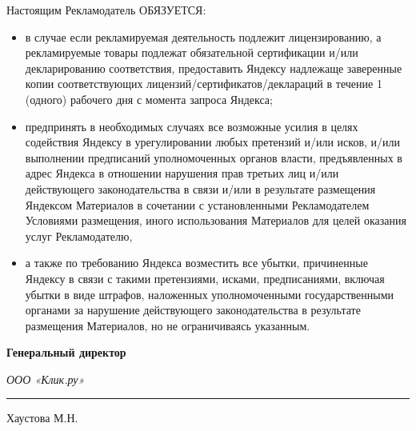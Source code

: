 \noindent
    Настоящим Рекламодатель ОБЯЗУЕТСЯ:

\begin{itemize}
    \item в случае если рекламируемая деятельность подлежит лицензированию,
        а рекламируемые товары подлежат обязательной сертификации и/или
        декларированию соответствия, предоставить Яндексу надлежаще заверенные
        копии соответствующих лицензий/сертификатов/деклараций в течение 1
        (одного) рабочего дня с момента запроса Яндекса;

    \item предпринять в необходимых случаях все возможные усилия в целях
        содействия Яндексу в урегулировании любых претензий и/или исков,
        и/или выполнении предписаний уполномоченных органов власти,
        предъявленных в адрес Яндекса в отношении нарушения прав третьих
        лиц и/или действующего законодательства в связи и/или в результате
        размещения Яндексом Материалов в сочетании с установленными
        Рекламодателем Условиями размещения, иного использования Материалов
        для целей оказания услуг Рекламодателю,

    \item а также по требованию Яндекса возместить все убытки, причиненные
        Яндексу в связи с такими претензиями, исками, предписаниями,
        включая убытки в виде штрафов, наложенных уполномоченными
        государственными органами за нарушение действующего законодательства
        в результате размещения Материалов, но не ограничиваясь указанным.

\end{itemize}

\vspace{3em}

\noindent
\bf Генеральный директор

\noindent
\sl ООО «Клик.ру» \hspace{5cm} \rule{5cm}{0.2mm}Хаустова М.Н.

\rm\bf



